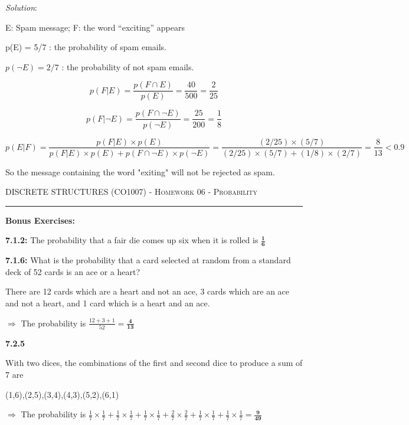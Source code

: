 \documentclass[12pt]{amsart}
\begin{document}
\textit{Solution}:

E: Spam message; F: the word “exciting” appears

p(E) = 5/7 : the probability of spam emails.

$p(\neg E) = 2/7$ : the probability of not spam emails.

\[p(F|E)=\frac{p(F\cap E)}{p(E)} = \frac{40}{500}=\frac{2}{25}\]

\[p(F|\neg E)=\frac{p(F\cap \neg E)}{p(\neg E)}=\frac{25}{200}=\frac{1}{8}\]

\[p(E|F)=\frac{p(F|E)\times p(E)}{p(F|E)\times p(E)+p(F\cap \neg E)\times p(\neg E)}=\frac{(2/25)\times (5/7)}{(2/25)\times (5/7)+(1/8)\times(2/7)}=\frac{8}{13} < 0.9\]

So the message containing the word "exiting" will not be rejected as spam.

\newpage

{\scshape } \hfill {\scshape DISCRETE STRUCTURES (CO1007) - Homework 06 - Probability} \hfill {\scshape }
 
\smallskip

\hrule

\bigskip

\bigskip 
\textbf{Bonus Exercises: }

\textbf{7.1.2: }The probability that a fair die comes up six when
it is rolled is $\mathbf{\frac{1}{6}}$

\medskip

\textbf{7.1.6: }What is the probability that a card selected at random
from a standard deck of 52 cards is an ace or a heart?

There are 12 cards which are a heart and not an ace, 3 cards which are an ace and not a heart, and 1 card which is a heart and an ace.

$\Rightarrow$ The probability is $\frac{12+3+1}{52}=\mathbf{\frac{4}{13}}$
\medskip

\textbf{7.2.5}

With two dices, the combinations of the first and second dice to produce a sum of 7 are

(1,6),(2,5),(3,4),(4,3),(5,2),(6,1)

$\Rightarrow$ The probability is $\frac{1}{7}\times\frac{1}{7}+\frac{1}{7}\times\frac{1}{7}+\frac{1}{7}\times\frac{1}{7}+\frac{2}{7}\times\frac{2}{7}+\frac{1}{7}\times\frac{1}{7}+\frac{1}{7}\times\frac{1}{7}=\mathbf{\frac{9}{49}}$
\medskip
\end{document}
